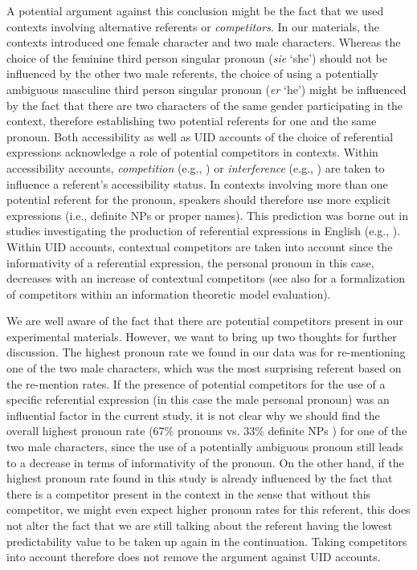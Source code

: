 \documentclass[output=paper,colorlinks,citecolor=brown]{langscibook}
\begin{document}
\largerpage
A potential argument against this conclusion might be the fact that we used contexts involving alternative referents or \textit{competitors}. In our materials, the contexts introduced one female character and two male characters. Whereas the choice of the feminine third person singular pronoun (\textit{sie} `she') should not be influenced by the other two male referents, the choice of using a potentially ambiguous masculine third person singular pronoun (\textit{er} `he') might be influenced by the fact that there are two characters of the same gender participating in the context, therefore establishing two potential referents for one and the same pronoun.
Both accessibility as well as UID accounts of the choice of referential expressions acknowledge a role of potential competitors in contexts. Within accessibility accounts, \textit{competition} (e.g., \citealt{Ariel-90-book}) or \textit{interference} (e.g., \citealt{Givon-84-book}) are taken to influence a referent's accessibility status. In contexts involving more than one potential referent for the pronoun, speakers should therefore use more explicit expressions (i.e., definite NPs or proper names). This prediction was borne out in studies investigating the production of referential expressions in English (e.g., \citealt{Arnold::Griffin-07}).
Within UID accounts, contextual competitors are taken into account since the informativity of a referential expression, the personal pronoun in this case, decreases with an increase of contextual competitors (see also \citealt{Orita::al-21} for a formalization of competitors within an information theoretic model evaluation). 

We are well aware of the fact that there are potential competitors present in our experimental materials. However, we want to bring up two thoughts for further discussion. The highest pronoun rate we found in our data was for re-mentioning one of the two male characters, which was the most surprising referent based on the re-mention rates. If the presence of potential competitors for the use of a specific referential expression (in this case the male personal pronoun) was an influential factor in the current study, it is not clear why we should find the overall highest pronoun rate (67\% pronouns vs. 33\% definite NPs ) for one of the two male characters, since the use of a potentially ambiguous pronoun still leads to a decrease in terms of informativity of the pronoun. On the other hand, if the highest pronoun rate found in this study is already influenced by the fact that there is a competitor present in the context in the sense that without this competitor, we might even expect higher pronoun rates for this referent, this does not alter the fact that we are still talking about the referent having the lowest predictability value to be taken up again in the continuation. Taking competitors into account therefore does not remove the argument against UID accounts.
\end{document}
